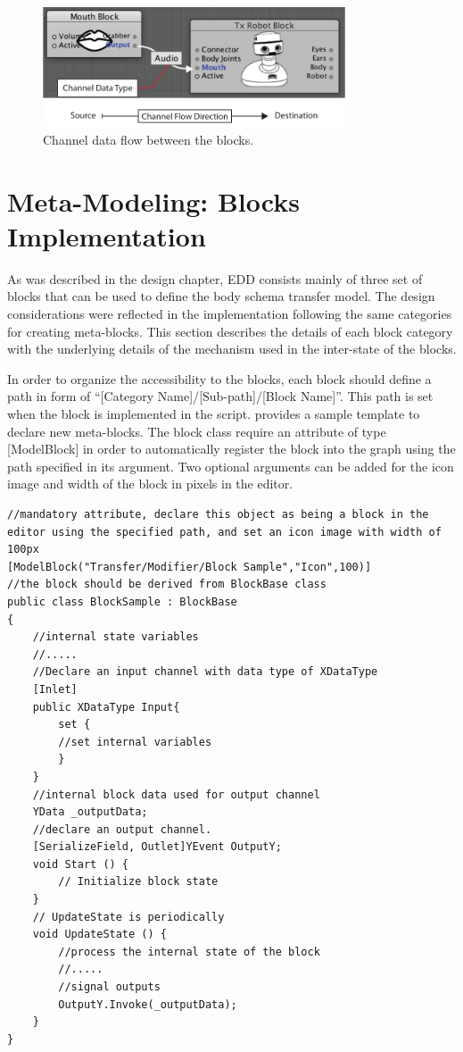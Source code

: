 \begin{figure}[t!]
\centering
\captionsetup{justification=centering} 
\includegraphics[width=0.8\textwidth]{figures/system/Blocks/Flow.pdf}
\caption{Channel data flow between the blocks.}
  \label{fig:system-blocks-flow}
\end{figure}


\section{Meta-Modeling: Blocks Implementation}

As was described in the design chapter, EDD consists mainly of three set of blocks that can be used to define the body schema transfer model. The design considerations were reflected in the implementation following the same categories for creating meta-blocks. This section describes the details of each block category with the underlying details of the mechanism used in the inter-state of the blocks. 

In order to organize the accessibility to the blocks, each block should define a path in form of ``[Category Name]/[Sub-path]/[Block Name]''. This path is set when the block is implemented in the script.  provides a sample template to declare new meta-blocks. The block class require an attribute of type [ModelBlock] in order to automatically register the block into the graph using the path specified in its argument. Two optional arguments can be added for the icon image and width of the block in pixels in the editor.

\begin{lstlisting}[caption=a definition template class for meta-blocks objects, label=lst:blockcode]
//mandatory attribute, declare this object as being a block in the editor using the specified path, and set an icon image with width of 100px
[ModelBlock("Transfer/Modifier/Block Sample","Icon",100)] 
//the block should be derived from BlockBase class
public class BlockSample : BlockBase 
{
    //internal state variables
    //.....
    //Declare an input channel with data type of XDataType
	[Inlet]
	public XDataType Input{
		set {
		//set internal variables
		}
	}
	//internal block data used for output channel
	YData _outputData;
	//declare an output channel. 
	[SerializeField, Outlet]YEvent OutputY; 
	void Start () {
	    // Initialize block state
	}
	// UpdateState is periodically
	void UpdateState () {
	    //process the internal state of the block
	    //.....
	    //signal outputs
	    OutputY.Invoke(_outputData);
	}
}
\end{lstlisting}


